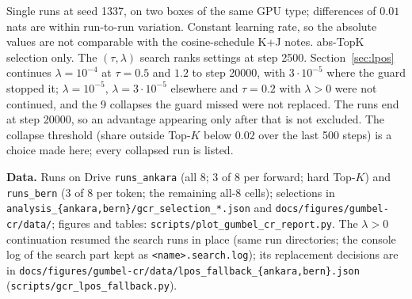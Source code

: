 \documentclass[11pt,a4paper]{article}
\newcommand{\code}[1]{\texttt{#1}}
\begin{document}
Single runs at seed 1337, on two boxes of the same GPU type; differences of
$0.01$ nats are within run-to-run variation. Constant learning rate, so the
absolute values are not comparable with the cosine-schedule K+J notes. abs-TopK
selection only. The $(\tau, \lambda)$ search ranks settings at step 2500.
Section~\ref{sec:lpos} continues $\lambda = 10^{-4}$ at $\tau = 0.5$ and $1.2$ to
step 20000, with $3\cdot10^{-5}$ where the guard stopped it; $\lambda = 10^{-5}$,
$\lambda = 3\cdot10^{-5}$ elsewhere and $\tau = 0.2$ with $\lambda > 0$ were not
continued, and the 9 collapses the guard missed were not replaced. The runs end at
step 20000, so an advantage appearing only after that is not excluded. The collapse
threshold (share outside Top-$K$ below $0.02$ over the last 500 steps) is a choice
made here; every collapsed run is listed.

{\raggedright\textbf{Data.} Runs on Drive \code{runs\_ankara} (all 8; 3 of 8 per forward;
hard Top-$K$) and \code{runs\_bern} (3 of 8 per token; the remaining
all-8 cells); selections in \code{analysis\_\{ankara,bern\}/gcr\_selection\_*.json}
and \code{docs/figures/gumbel-cr/data/}; figures and tables:
\code{scripts/plot\_gumbel\_cr\_report.py}. The $\lambda > 0$ continuation
resumed the search runs in place (same run directories; the console log of the
search part kept as \code{<name>.search.log}); its replacement decisions are in
\code{docs/figures/gumbel-cr/data/lpos\_fallback\_\{ankara,bern\}.json}
(\code{scripts/gcr\_lpos\_fallback.py}).\par}
\end{document}
